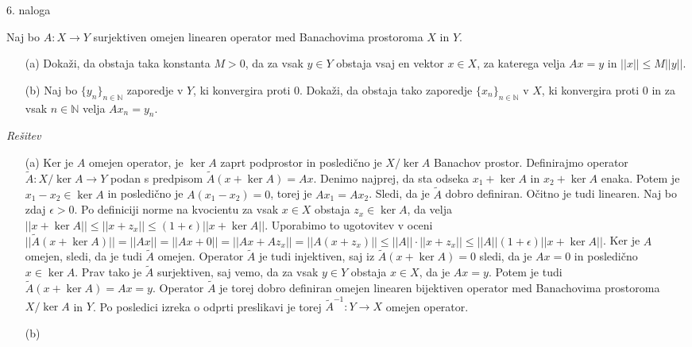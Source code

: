 \documentclass[a4paper, 12pt]{article}
\newcommand{\N}{\mathbb{N}}
\begin{document}
\begin{flushleft}
6. naloga
\end{flushleft}
Naj bo $A:X\rightarrow Y$ surjektiven omejen linearen operator med Banachovima prostoroma $X$ in $Y$.
\begin{enumerate}	
\item[(a)] Dokaži, da obstaja taka konstanta $M> 0$, da za vsak $y\in Y$ obstaja vsaj en vektor $x\in X$, za katerega velja $Ax = y$ in $||x|| \le M ||y||$.
\item[(b)] Naj bo $\{y_n\}_{n\in \N}$ zaporedje v $Y$, ki konvergira proti 0. Dokaži, da obstaja tako zaporedje $\{x_n\}_{n\in \N}$ v $X$, ki konvergira proti 0 in za vsak $n\in \N$ velja $Ax_n = y_n$.
\end{enumerate}
\emph{Rešitev}
\begin{enumerate}
\item[(a)]Ker je $A$ omejen operator, je $\ker A$ zaprt podprostor in posledično je $X/\ker A$ Banachov prostor. Definirajmo operator $\tilde{A}: X/\ker A \rightarrow Y$ podan s predpisom $\tilde{A}(x+\ker A) = Ax$. Denimo najprej, da sta odseka $x_1 + \ker A$ in $x_2 + \ker A$ enaka. Potem je $x_1 - x_2 \in \ker A$ in posledično je $A(x_1 - x_2)=0 $, torej je $Ax_1 = Ax_2$. Sledi, da je $\tilde{A}$ dobro definiran. Očitno je tudi linearen. Naj bo zdaj $\epsilon > 0$. Po definiciji norme na kvocientu za vsak $x \in X$ obstaja $z_x \in \ker A$, da velja $||x+\ker A|| \le ||x+z_x|| \le (1+\epsilon)|| x+\ker A||$. Uporabimo to ugotovitev v oceni $||\tilde{A}(x+\ker A)|| = ||Ax|| = ||Ax + 0|| = ||Ax + Az_x|| = ||A(x+z_x)|| \le ||A|| \cdot ||x+z_x|| \le ||A||(1+\epsilon)||x+\ker A||$. Ker je $A$ omejen, sledi, da je tudi $\tilde{A}$ omejen. Operator $\tilde{A}$ je tudi injektiven, saj iz $\tilde{A}(x+\ker A) = 0$ sledi, da je $Ax=0$ in posledično $x\in \ker A$. Prav tako je $\tilde{A}$ surjektiven, saj vemo, da za vsak $y\in Y$ obstaja $x\in X$, da je $Ax=y$. Potem je tudi $\tilde{A}(x+\ker A) = Ax = y$.
Operator $\tilde{A}$ je torej dobro definiran omejen linearen bijektiven operator med Banachovima prostoroma $X/\ker A$ in $Y$. Po posledici izreka o odprti preslikavi je torej $\tilde{A}^{-1} : Y\rightarrow X$ omejen operator.
\item[(b)]
\end{enumerate}
\end{document}

